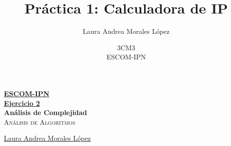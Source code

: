 \documentclass[12pt, fleqn]{article}                             %
\author{Laura Andrea Morales López}              %
\title{Práctica 1: Calculadora de IP}
\author{3CM3\\
	ESCOM-IPN}
\theoremstyle{break}                                            %
\begin{document}
\begin{titlepage}
    
    \pagecolor{TitlePageColor}                                      %
    \color{white}                                                   %

    \vspace                                                         %
    \baselineskip                                                   %

    \makebox[0pt][l]{\rule{1.3\textwidth}{3pt}}                     %
    
    \href{https://compilandoconocimiento.com}                       %
    {\textbf{\textsc{\Huge ESCOM-IPN}}}\\[2.7cm]                    %

    \href{\ProjectNameLink/LibroRedes}                       %
    {\fontsize{36}{50}                                              %
        \selectfont \textbf{Ejercicio 2}}\\[0.5cm]       %
    {\fontsize{36}{50}                                              %
        \selectfont \textbf{Análisis de Complejidad}}\\[0.5cm]                %
    \textcolor{ColorSubtext}                                        %
        {\textsc{\LARGE Análisis de Algoritmos}}     %
    
    \vfill                                                          %
    
    \href{https://compilandoconocimiento.com/}                    %
    {\LARGE \textsf{Laura Andrea Morales López}}   %

    \vspace                                                         %
    \baselineskip                                                   %
    

\end{titlepage}
\end{document}
